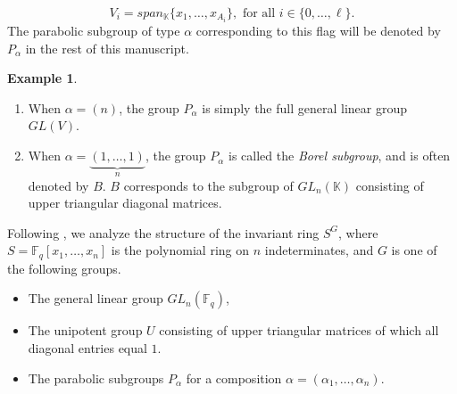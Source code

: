 \documentclass[12pt,a4paper]{report}
\theoremstyle{definition}
\theoremstyle{remark}
\theoremstyle{definition}
\newtheorem{example}[theorem]{Example}
\begin{document}
\begin{equation*}
    V_i = span_{\mathbb{K}}\{x_1, \ldots, x_{A_i}\}, \text{ for all } i\in \{0, \ldots, \ell\}.
\end{equation*}
The parabolic subgroup of type $\alpha$ corresponding to this flag will be denoted by $P_{\alpha}$ in the rest of this manuscript.
\begin{example}\label{example:parabolic_subgrps}
    \begin{enumerate}
        \item When $\alpha = (n)$, the group $P_{\alpha}$ is simply the full general linear group $GL(V)$.
        \item When $\alpha = \underbrace{(1, \ldots, 1)}_{n}$, the group $P_{\alpha}$ is called the \emph{Borel subgroup}, and is often denoted by $B$. $B$ corresponds to the subgroup of $GL_n(\mathbb{K})$ consisting of upper triangular diagonal matrices. 
    \end{enumerate}
\end{example}
Following \cite{hewett_modular_1996, mui,wilkerson}, we analyze the structure of the invariant ring $S^G$, where $S = \mathbb{F}_q[x_1, \ldots, x_n]$ is the polynomial ring on $n$ indeterminates, and $G$ is one of the following groups.
\begin{itemize}
    \item The general linear group $GL_n(\mathbb{F}_q)$,
    \item The unipotent group $U$ consisting of upper triangular matrices of which all diagonal entries equal $1$.
    \item The parabolic subgroups $P_{\alpha}$ for a composition $\alpha = (\alpha_1, \ldots, \alpha_n)$.
\end{itemize}
\end{document}
